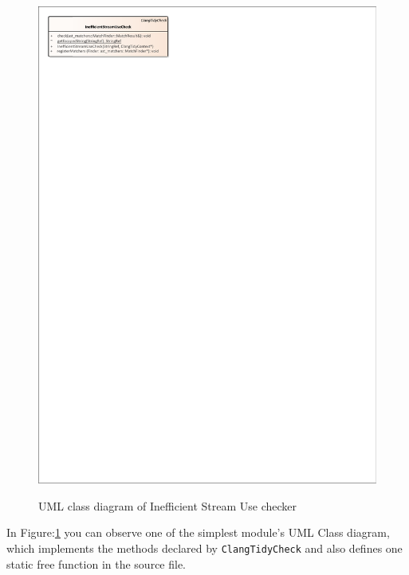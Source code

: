 \begin{figure}[H]
	\caption{UML class diagram of Inefficient Stream Use checker}
	\centering
	\includegraphics[scale=1.8]{images/InefficientStreamUse.pdf}
	\label{stream_check_class}
\end{figure}
\par In Figure:\ref{stream_check_class} you can observe one of the simplest module's UML Class diagram, which implements the methods declared by \verb|ClangTidyCheck| and also defines one static free function in the source file.
